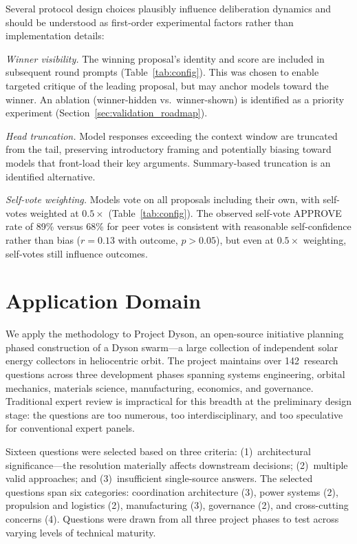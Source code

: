 \documentclass[11pt,a4paper]{article}
\begin{document}
Several protocol design choices plausibly influence deliberation dynamics and should be understood as first-order experimental factors rather than implementation details:

\textit{Winner visibility.} The winning proposal's identity and score are included in subsequent round prompts (Table~\ref{tab:config}). This was chosen to enable targeted critique of the leading proposal, but may anchor models toward the winner. An ablation (winner-hidden vs.\ winner-shown) is identified as a priority experiment (Section~\ref{sec:validation_roadmap}).

\textit{Head truncation.} Model responses exceeding the context window are truncated from the tail, preserving introductory framing and potentially biasing toward models that front-load their key arguments. Summary-based truncation is an identified alternative.

\textit{Self-vote weighting.} Models vote on all proposals including their own, with self-votes weighted at $0.5\times$ (Table~\ref{tab:config}). The observed self-vote APPROVE rate of 89\% versus 68\% for peer votes is consistent with reasonable self-confidence rather than bias ($r = 0.13$ with outcome, $p > 0.05$), but even at $0.5\times$ weighting, self-votes still influence outcomes.

\section{Application Domain}
\label{sec:domain}

We apply the methodology to Project Dyson, an open-source initiative planning phased construction of a Dyson swarm---a large collection of independent solar energy collectors in heliocentric orbit. The project maintains over 142~research questions across three development phases spanning systems engineering, orbital mechanics, materials science, manufacturing, economics, and governance. Traditional expert review is impractical for this breadth at the preliminary design stage: the questions are too numerous, too interdisciplinary, and too speculative for conventional expert panels.

Sixteen questions were selected based on three criteria: (1)~architectural significance---the resolution materially affects downstream decisions; (2)~multiple valid approaches; and (3)~insufficient single-source answers. The selected questions span six categories: coordination architecture (3), power systems (2), propulsion and logistics (2), manufacturing (3), governance (2), and cross-cutting concerns (4). Questions were drawn from all three project phases to test across varying levels of technical maturity.
\end{document}
